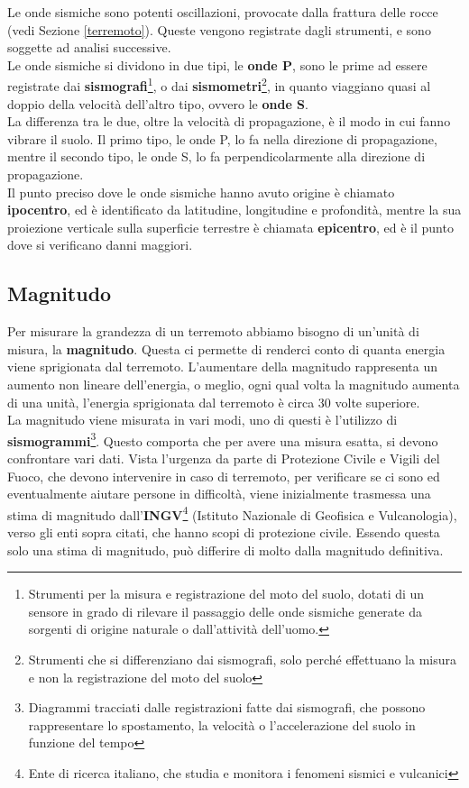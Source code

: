 Le onde sismiche sono potenti oscillazioni, provocate dalla frattura delle rocce (vedi Sezione \ref{terremoto}). Queste vengono registrate dagli strumenti, e sono soggette ad analisi successive.\\
Le onde sismiche si dividono in due tipi, le \textbf{onde P}, sono le prime ad essere registrate dai \textbf{sismografi}\footnote{Strumenti per la misura e registrazione del moto del suolo, dotati di un sensore in grado di rilevare il passaggio delle onde sismiche generate da sorgenti di origine naturale o dall'attivit\`a dell'uomo.}, o dai \textbf{sismometri}\footnote{Strumenti che si differenziano dai sismografi, solo perch\'e effettuano la misura e non la registrazione del moto del suolo}, in quanto viaggiano quasi al doppio della velocit\`a dell'altro tipo, ovvero le \textbf{onde S}.\\
La differenza tra le due, oltre la velocit\`a di propagazione, \`e il modo in cui fanno vibrare il suolo. Il primo tipo, le onde P, lo fa nella direzione di propagazione, mentre il secondo tipo, le onde S, lo fa perpendicolarmente alla direzione di propagazione.\\
Il punto preciso dove le onde sismiche hanno avuto origine \`e chiamato \textbf{ipocentro}, ed \`e identificato da latitudine, longitudine e profondit\`a, mentre la sua proiezione verticale sulla superficie terrestre \`e chiamata \textbf{epicentro}, ed \`e il punto dove si verificano danni maggiori.\\

\subsection{Magnitudo}

Per misurare la grandezza di un terremoto abbiamo bisogno di un'unit\`a di misura, la \textbf{magnitudo}. Questa ci permette di renderci conto di quanta energia viene sprigionata dal terremoto. L'aumentare della magnitudo rappresenta un aumento non lineare dell'energia, o meglio, ogni qual volta la magnitudo aumenta di una unit\`a, l'energia sprigionata dal terremoto \`e circa 30 volte superiore.\\
La magnitudo viene misurata in vari modi, uno di questi \`e l'utilizzo di \textbf{sismogrammi}\footnote{Diagrammi tracciati dalle registrazioni fatte dai sismografi, che possono rappresentare lo spostamento, la velocit\`a o l'accelerazione del suolo in funzione del tempo}. Questo comporta che per avere una misura esatta, si devono confrontare vari dati. Vista l'urgenza da parte di Protezione Civile e Vigili del Fuoco, che devono intervenire in caso di terremoto, per verificare se ci sono ed eventualmente aiutare persone in difficolt\`a, viene inizialmente trasmessa una stima di magnitudo dall'\textbf{INGV}\footnote{Ente di ricerca italiano, che studia e monitora i fenomeni sismici e vulcanici} (Istituto Nazionale di Geofisica e Vulcanologia), verso gli enti sopra citati, che hanno scopi di protezione civile. Essendo questa solo una stima di magnitudo, pu\`o differire di molto dalla magnitudo definitiva.

